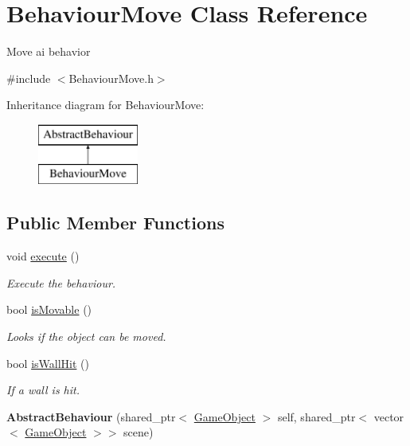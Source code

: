 \hypertarget{class_behaviour_move}{}\section{Behaviour\+Move Class Reference}
\label{class_behaviour_move}


Move ai behavior  




{\ttfamily \#include $<$Behaviour\+Move.\+h$>$}

Inheritance diagram for Behaviour\+Move\+:\begin{figure}[H]
\begin{center}
\leavevmode
\includegraphics[height=2.000000cm]{class_behaviour_move}
\end{center}
\end{figure}
\subsection*{Public Member Functions}
\begin{DoxyCompactItemize}
\item 
void \mbox{\hyperlink{class_behaviour_move_a4cccd6dbe5ccf37b1522fc71a807f080}{execute}} ()
\begin{DoxyCompactList}\small\item\em Execute the behaviour. \end{DoxyCompactList}\item 
bool \mbox{\hyperlink{class_behaviour_move_a3d4182913183e85af80a1eba69a457a1}{is\+Movable}} ()
\begin{DoxyCompactList}\small\item\em Looks if the object can be moved. \end{DoxyCompactList}\item 
bool \mbox{\hyperlink{class_behaviour_move_aebfd734f768321735b20f4e66ea1faab}{is\+Wall\+Hit}} ()
\begin{DoxyCompactList}\small\item\em If a wall is hit. \end{DoxyCompactList}\item 
\mbox{\label{class_behaviour_move_a8a3a9217b3179f949a1d6a32f340c00c}} 
{\bfseries Abstract\+Behaviour} (shared\+\_\+ptr$<$ \mbox{\hyperlink{class_game_object}{Game\+Object}} $>$ self, shared\+\_\+ptr$<$ vector$<$ \mbox{\hyperlink{class_game_object}{Game\+Object}} $>$$>$ scene)
\end{DoxyCompactItemize}
